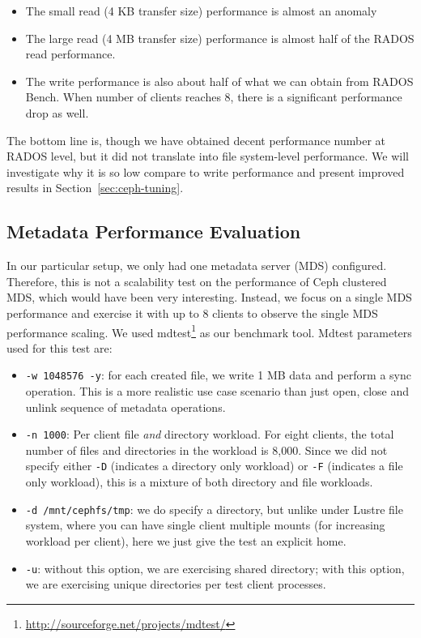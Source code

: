 \begin{itemize}

  \item The small read (4 KB transfer size) performance is almost an anomaly

  \item The large read (4 MB transfer size) performance is almost half of the
  RADOS read performance.
   
  \item The write performance is also about half of what we can obtain from
  RADOS Bench. When number of clients reaches 8, there is a significant
  performance drop as well. 

\end{itemize}

The bottom line is, though we have obtained decent performance number at RADOS
level, but it did not translate into file system-level performance. We will
investigate why it is so low compare to write performance and present improved
results in Section~\ref{sec:ceph-tuning}.


\subsection{Metadata Performance Evaluation}


In our particular setup, we only had one metadata server (MDS) configured.
Therefore, this is not a scalability test on the performance of Ceph clustered
MDS, which would have been very interesting.  Instead, we focus on a single MDS
performance and exercise it with up to 8 clients to observe the single MDS
performance scaling. We used
mdtest\footnote{\url{http://sourceforge.net/projects/mdtest/}} as our benchmark
tool. Mdtest parameters used for this test are:

\begin{itemize}
\item \verb!-w 1048576 -y!: for each created file, we write 1 MB data and
perform a sync operation.  This is a more realistic use case scenario than just
open, close and unlink sequence of metadata operations.

\item \verb!-n 1000!: Per client file \textit{and} directory workload. For
eight clients, the total number of files and directories in the workload is
8,000. Since we did not specify either \verb!-D! (indicates a directory only
workload) or \verb!-F! (indicates a file only workload), this is a mixture of
both directory and file workloads.

\item \verb!-d /mnt/cephfs/tmp!: we do specify a directory, but unlike under
Lustre file system, where you can have single client multiple mounts (for
increasing workload per client), here we just give the test an explicit home.

\item \verb!-u!: without this option, we are exercising shared directory; with
this option, we are exercising unique directories per test client processes.

\end{itemize}

